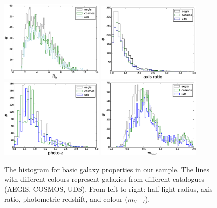 \documentclass[useAMS,usenatbib]{mn2e}
\begin{document}
\begin{figure}
  \centerline{\includegraphics[width=5.0cm]{zhisrh.eps}
    \includegraphics[width=5.0cm]{zhisratio.eps}
    \includegraphics[width=5.0cm]{zhisphotoz.eps}
    \includegraphics[width=5.0cm]{zhiscolor.eps}}
  \caption{The histogram for basic galaxy properties in our
    sample. The lines with different colours represent galaxies from
    different catalogues (AEGIS, COSMOS, UDS). From left to right: half
    light radius, axis ratio, photometric redshift, and colour
    ($m_{V-I}$).}
  \label{fig:datapro1}
\end{figure}
%
\end{document}
